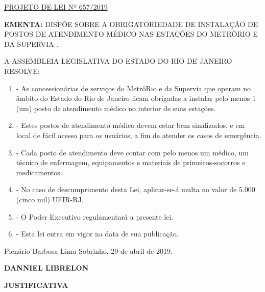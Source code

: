 \documentclass[10pt]{article}
\date{}
\begin{document}
\maketitle
\begin{center}
  \huge
  \vspace{-3cm}\href{http://alerjln1.alerj.rj.gov.br/scpro1923.nsf/f4b46b3cdbba990083256cc900746cf6/20d9df819eb4cb938325840900603833?OpenDocument}{PROJETO DE LEI Nº 657/2019}
\bigskip
\bigskip
\bigskip
  
\end{center}

\textbf{EMENTA:} 
DISPÕE SOBRE A OBRIGATORIEDADE DE INSTALAÇÃO DE POSTOS DE ATENDIMENTO MÉDICO NAS ESTAÇÕES DO METRÔRIO E DA SUPERVIA .








\bigskip

\noindent
A ASSEMBLEIA LEGISLATIVA DO ESTADO DO RIO DE JANEIRO RESOLVE:

\begin{enumerate}[label=Art. \arabic*\textdegree]
\item - As concessionárias de serviços do MetrôRio e da Supervia que operam no âmbito do Estado do Rio de Janeiro ficam obrigadas a instalar pelo menos 1 (um) posto de atendimento médico no interior de suas estações.

\item - Estes postos de atendimento médico devem estar bem sinalizados, e em local de fácil acesso para os usuários, a fim de atender os casos de emergência.

\item - Cada posto de atendimento deve contar com pelo menos um médico, um técnico de enfermagem, equipamentos e materiais de primeiros-socorros e medicamentos.

\item - No caso de descumprimento desta Lei, aplicar-se-á multa no valor de 5.000 (cinco mil) UFIR-RJ.

\item - O Poder Executivo regulamentará a presente lei.
				
\item - Esta lei entra em vigor na data de sua publicação.


\end{enumerate}




\begin{center}
  Plenário Barbosa Lima Sobrinho, 29   de abril de 2019.

   \bigskip

  \textbf{ DANNIEL LIBRELON}

  \bigskip

  \textbf{JUSTIFICATIVA}
  \bigskip

\end{center}
\end{document}
